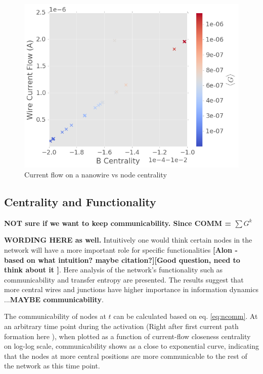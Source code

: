 \documentclass[%
 reprint,
 amsmath,amssymb,
 aps,
floatfix,
]{revtex4-2}
\begin{document}
\begin{figure}[h]
	\centering
	\includegraphics[width=1\linewidth]{figure/I_cent}
	\caption{Current flow on a nanowire vs node centrality}
	\label{fig:i_cent}
\end{figure}

\subsection{\label{sec:level2} Centrality and Functionality}

\textbf{NOT sure if we want to keep communicability. Since COMM = $\sum G^k$}

\textbf{WORDING HERE as well.} Intuitively one would think certain nodes in the network will have a more important role for specific functionalities \textbf{[Alon - based on what intuition? maybe citation?][Good question, need to think about it ]}. Here analysis of the network's functionality such as communicability and transfer entropy are presented. The results suggest that more central wires and junctions have higher importance in information dynamics ...\textbf{MAYBE communicability}.  

The communicability of nodes at $t$ can be calculated based on eq. \ref{eq:ncomm}. At an arbitrary time point during the activation (Right after first current path formation here ), when plotted as a function of current-flow closeness centrality on log-log scale, communicability shows as a close to exponential curve, indicating that the nodes at more central positions are more communicable to the rest of the network as this time point. 
\end{document}
